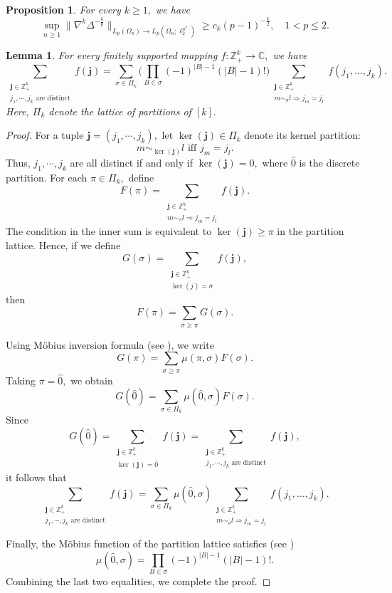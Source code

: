 \documentclass{amsart}
\numberwithin{equation}{section}
\newtheorem{lem}[thm]{Lemma}
\newtheorem{prop}[thm]{Proposition}
\theoremstyle{definition}
\theoremstyle{remark}
\newcommand{\1}{\mathbf 1}
\begin{document}
\begin{prop}\label{prop:constants} For every $k\geq1,$ we have
$$\sup_{n\geq1}\|\nabla^k\Delta^{-\frac{k}{p}}\|_{L_p(\Omega_n)\to L_p(\Omega_n;\ell^{n^k}_2)}\geq c_k(p-1)^{-\frac{k}{2}},\quad 1<p\leq 2.$$
\end{prop}

\begin{lem}\label{rearrangement lemma} For every finitely supported mapping $f:\mathbb{Z}^k_+\to\mathbb{C},$ we have 
$$\sum_{\substack{\mathbf{j}\in\mathbb{Z}_+^k\\
j_1,\cdots,j_k\mbox{ are distinct}}}f(\mathbf{j})=\sum_{\sigma\in\Pi_k}
\Big(\prod_{B\in\sigma}
(-1)^{|B|-1}(|B|-1)!\Big)\sum_{\substack{\mathbf{j}\in\mathbb{Z}_+^k\\m\sim_\sigma l\Rightarrow j_m=j_l}}
f(j_1,\ldots,j_k).$$
Here, $\Pi_k$ denote the lattice of partitions of $[k].$
\end{lem}
\begin{proof} For a tuple $\mathbf{j}=(j_1,\cdots,j_k),$ let $\ker(\mathbf{j})\in\Pi_k$ denote its kernel partition:
$$m\sim_{\ker(\mathbf{j})}l \mbox{ iff }j_m=j_l.$$
Thus, $j_1,\cdots,j_k$ are all distinct if and only if $\ker(\mathbf{j})=\hat{0},$ where $\hat{0}$ is the discrete partition. For each $\pi\in\Pi_k,$ define
$$F(\pi)=\sum_{\substack{\mathbf{j}\in\mathbb{Z}_+^k\\
m\sim_\pi l\Rightarrow j_m=j_l}}f(\mathbf{j}).$$
The condition in the inner sum is equivalent to $\ker(\mathbf{j})\geq\pi$ in the partition lattice. Hence, if we define
$$G(\sigma)=\sum_{\substack{\mathbf{j}\in\mathbb{Z}_+^k\\ \ker(j)=\sigma}}f(\mathbf{j}),$$
then
$$F(\pi)=\sum_{\sigma\geq\pi}G(\sigma).$$

Using M\"obius inversion formula (see \cite[Proposition 3.7.2]{Stan2012}), we write
$$G(\pi)=\sum_{\sigma\geq\pi}\mu(\pi,\sigma)F(\sigma).$$
Taking $\pi=\hat{0},$ we obtain
$$G(\hat{0})=\sum_{\sigma\in\Pi_k}\mu(\hat{0},\sigma)F(\sigma).$$
Since
$$G(\hat{0})=\sum_{\substack{\mathbf{j}\in\mathbb{Z}_+^k\\
\ker(\mathbf{j})=\hat{0}}}f(\mathbf{j})=\sum_{\substack{\mathbf{j}\in\mathbb{Z}_+^k\\
j_1,\cdots,j_k\mbox{ are distinct}}}f(\mathbf{j}),$$
it follows that
$$\sum_{\substack{\mathbf{j}\in\mathbb{Z}_+^k\\
j_1,\cdots,j_k\mbox{ are distinct}}}f(\mathbf{j})=\sum_{\sigma\in\Pi_k}
\mu(\hat 0,\sigma)\sum_{\substack{\mathbf{j}\in\mathbb{Z}_+^k\\m\sim_\sigma l\Rightarrow j_m=j_l}}
f(j_1,\ldots,j_k).$$

Finally, the M\"obius function of the partition lattice satisfies (see \cite[Example 3.10.4, pp. 318--319]{Stan2012})
$$
\mu(\hat{0},\sigma)=\prod_{B\in\sigma}(-1)^{|B|-1}(|B|-1)!.
$$
Combining the last two equalities, we complete the proof.
\end{proof}
\end{document}
